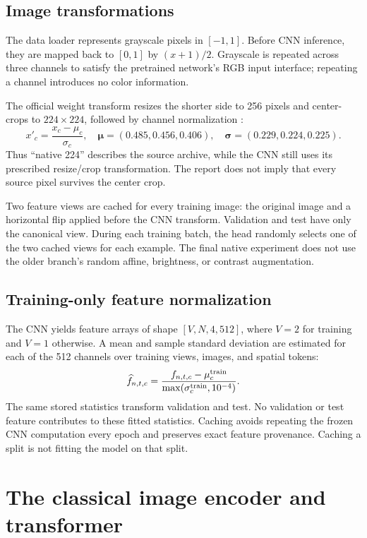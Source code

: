 \documentclass[11pt,a4paper]{report}
\newcommand{\code}[1]{\texttt{\detokenize{#1}}}
\begin{document}
\section{Image transformations}
The data loader represents grayscale pixels in $[-1,1]$. Before CNN inference, they are mapped back to $[0,1]$ by $(x+1)/2$. Grayscale is repeated across three channels to satisfy the pretrained network's RGB input interface; repeating a channel introduces no color information.

The official \code{IMAGENET1K_V1} weight transform resizes the shorter side to 256 pixels and center-crops to $224\times224$, followed by channel normalization \cite{resnetdocs}:
\begin{equation}
x'_c=\frac{x_c-\mu_c}{\sigma_c},\quad
\boldsymbol\mu=(0.485,0.456,0.406),\quad
\boldsymbol\sigma=(0.229,0.224,0.225).
\end{equation}
Thus ``native 224'' describes the source archive, while the CNN still uses its prescribed resize/crop transformation. The report does not imply that every source pixel survives the center crop.

Two feature views are cached for every training image: the original image and a horizontal flip applied before the CNN transform. Validation and test have only the canonical view. During each training batch, the head randomly selects one of the two cached views for each example. The final native experiment does not use the older branch's random affine, brightness, or contrast augmentation.

\section{Training-only feature normalization}
The CNN yields feature arrays of shape $[V,N,4,512]$, where $V=2$ for training and $V=1$ otherwise. A mean and sample standard deviation are estimated for each of the 512 channels over training views, images, and spatial tokens:
\begin{equation}
\widehat f_{n,t,c}=\frac{f_{n,t,c}-\mu_c^{\rm train}}
{\max(\sigma_c^{\rm train},10^{-4})}.
\end{equation}
The same stored statistics transform validation and test. No validation or test feature contributes to these fitted statistics. Caching avoids repeating the frozen CNN computation every epoch and preserves exact feature provenance. Caching a split is not fitting the model on that split.

\chapter{The classical image encoder and transformer}
\end{document}
